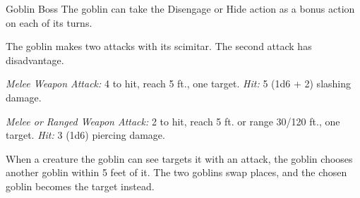 \documentclass[10pt,a4paper,twoside,bg=print,twocolumn,openany,nodeprecatedcode]{dndbook}
\begin{document}
\begin{DndMonster}[float=t]{Goblin Boss}
\DndMonsterBasics[
armor-class = {17 (\textit{chain shirt})},
hit-points = {\DndDice{6d6}},
speed = {30 ft.}
]
\DndMonsterAbilityScores[
 str = 10,
 dex = 14,
 con = 10,
 int = 10,
 wis = 8,
 cha = 10
]
\DndMonsterDetails[
skills = {Stealth +6},
senses = {darkvision 60 ft., passive perception 9},
languages = {Common, Goblin},
challenge = 1,
]
The goblin can take the Disengage or Hide action as a bonus action on each of its turns.

The goblin makes two attacks with its scimitar. The second attack has disadvantage.

\textsl{Melee Weapon Attack:} 4 to hit, reach 5 ft., one target. \textsl{Hit:} 5 (1d6 + 2) slashing damage.

\textsl{Melee or Ranged Weapon Attack:} 2 to hit, reach 5 ft. or range 30/120 ft., one target. \textsl{Hit:} 3 (1d6) piercing damage.

When a creature the goblin can see targets it with an attack, the goblin chooses another goblin within 5 feet of it. The two goblins swap places, and the chosen goblin becomes the target instead.

\end{DndMonster}
\end{document}
